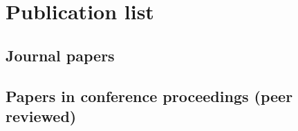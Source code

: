 {}

\chapter*{Publication list}

\footnotesize
\section*{Journal papers}
\section*{Papers in conference proceedings (peer reviewed)}
